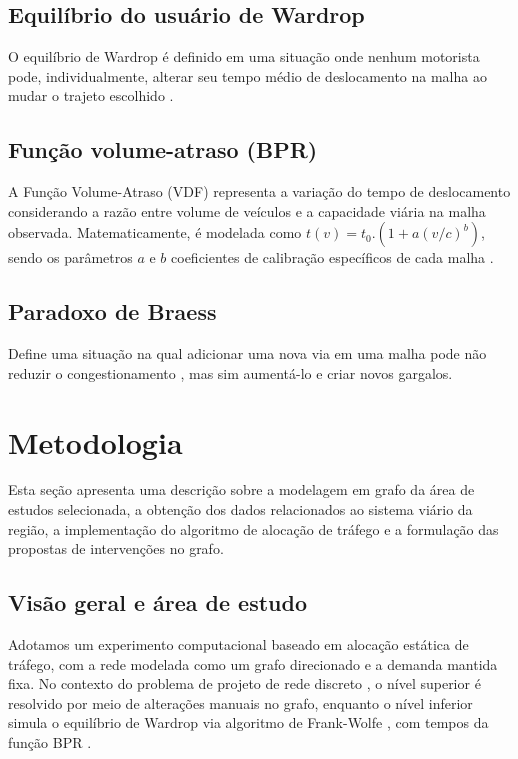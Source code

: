 \documentclass[portuguese]{sbc2025}%
\begin{document}
\subsection{Equilíbrio do usuário de Wardrop}
O equilíbrio de Wardrop é definido em uma situação onde nenhum motorista pode, individualmente, alterar seu tempo médio de deslocamento na malha ao mudar o trajeto escolhido \cite{wardrop1952}.

\subsection{Função volume-atraso (BPR)}
A Função Volume-Atraso (VDF) representa a variação do tempo de deslocamento considerando a razão entre volume de veículos e a capacidade viária na malha observada. Matematicamente, é modelada como $t(v) = t_0 . (1 + a(v/c)^b)$, sendo os parâmetros $a$ e $b$ coeficientes de calibração específicos de cada malha \cite{vdf4etapas}.

\subsection{Paradoxo de Braess}
Define uma situação na qual adicionar uma nova via em uma malha pode não reduzir o congestionamento \cite{braess2005}, mas sim aumentá-lo e criar novos gargalos.

\section{Metodologia}
\label{sec:metodologia}

Esta seção apresenta uma descrição sobre a modelagem em grafo da área de estudos selecionada, a obtenção dos dados relacionados ao sistema viário da região, a implementação do algoritmo de alocação de tráfego e a formulação das propostas de intervenções no grafo.

\subsection{Visão geral e área de estudo}
Adotamos um experimento computacional baseado em alocação estática de tráfego, com a rede modelada como um grafo direcionado e a demanda mantida fixa. No contexto do problema de projeto de rede discreto \cite{leblanc1975dndp}, o nível superior é resolvido por meio de alterações manuais no grafo, enquanto o nível inferior simula o equilíbrio de Wardrop \cite{wardrop1952} via algoritmo de Frank-Wolfe \cite{leblanc1975fw}, com tempos da função BPR \cite{bpr1964}.
\end{document}
